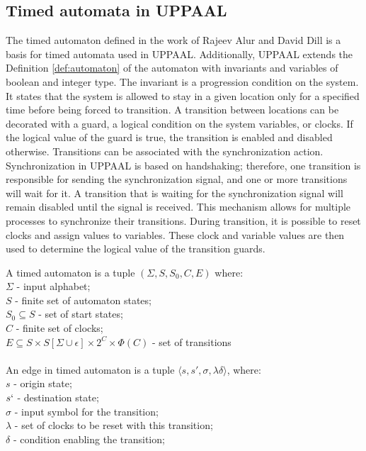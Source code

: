 \subsection{Timed automata in UPPAAL}
The timed automaton defined in the work of Rajeev Alur and David Dill \cite{Alur1990} is a basis for timed automata used in UPPAAL. Additionally, UPPAAL extends the Definition \ref{def:automaton} of the automaton with invariants and variables of boolean and integer type. The invariant is a progression condition on the system. It states that the system is allowed to stay in a given location only for a specified time before being forced to transition. A transition between locations can be decorated with a guard, a logical condition on the system variables, or clocks. If the logical value of the guard is true, the transition is enabled and disabled otherwise. Transitions can be associated with the synchronization action. Synchronization in UPPAAL is based on handshaking; therefore, one transition is responsible for sending the synchronization signal, and one or more transitions will wait for it. A transition that is waiting for the synchronization signal will remain disabled until the signal is received. This mechanism allows for multiple processes to synchronize their transitions. During transition, it is possible to reset clocks and assign values to variables. These clock and variable values are then used to determine the logical value of the transition guards.

\begin{definition}
A timed automaton is a tuple $(\Sigma, S, S_0, C, E)$ where:\\
$\Sigma$ - input alphabet;\\
$S$ - finite set of automaton states;\\
$S_0 \subseteq S$ - set of start states; \\
$C$ - finite set of clocks; \\
$E \subseteq S \times S [\Sigma \cup {\epsilon}] \times 2^C \times \Phi(C)$ - set of transitions\\\\
An edge in timed automaton is a tuple $\langle s, s', \sigma, \lambda \delta \rangle$, where:\\
$s$ - origin state;\\
$s`$ - destination state;\\
$\sigma$ - input symbol for the transition;\\
$\lambda$ - set of clocks to be reset with this transition;\\
$\delta$ - condition enabling the transition;\\
\label{def:automaton}
\end{definition}


